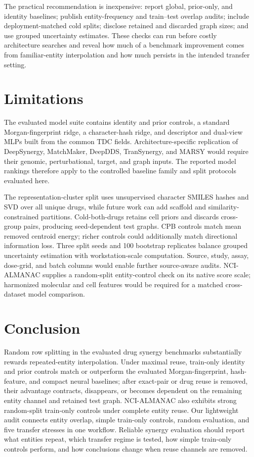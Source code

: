 \documentclass[conference]{IEEEtran}
\begin{document}
The practical recommendation is inexpensive: report global, prior-only, and identity baselines; publish entity-frequency and train--test overlap audits; include deployment-matched cold splits; disclose retained and discarded graph sizes; and use grouped uncertainty estimates. These checks can run before costly architecture searches and reveal how much of a benchmark improvement comes from familiar-entity interpolation and how much persists in the intended transfer setting.

\section{Limitations}

The evaluated model suite contains identity and prior controls, a standard Morgan-fingerprint ridge, a character-hash ridge, and descriptor and dual-view MLPs built from the common TDC fields. Architecture-specific replication of DeepSynergy, MatchMaker, DeepDDS, TranSynergy, and MARSY would require their genomic, perturbational, target, and graph inputs. The reported model rankings therefore apply to the controlled baseline family and split protocols evaluated here.

The representation-cluster split uses unsupervised character SMILES hashes and SVD over all unique drugs, while future work can add scaffold and similarity-constrained partitions. Cold-both-drugs retains cell priors and discards cross-group pairs, producing seed-dependent test graphs. CPB controls match mean removed centroid energy; richer controls could additionally match directional information loss. Three split seeds and 100 bootstrap replicates balance grouped uncertainty estimation with workstation-scale computation. Source, study, assay, dose-grid, and batch columns would enable further source-aware audits. NCI-ALMANAC supplies a random-split entity-control check on its native score scale; harmonized molecular and cell features would be required for a matched cross-dataset model comparison.

\section{Conclusion}

Random row splitting in the evaluated drug synergy benchmarks substantially rewards repeated-entity interpolation. Under maximal reuse, train-only identity and prior controls match or outperform the evaluated Morgan-fingerprint, hash-feature, and compact neural baselines; after exact-pair or drug reuse is removed, their advantage contracts, disappears, or becomes dependent on the remaining entity channel and retained test graph. NCI-ALMANAC also exhibits strong random-split train-only controls under complete entity reuse. Our lightweight audit connects entity overlap, simple train-only controls, random evaluation, and five transfer stresses in one workflow. Reliable synergy evaluation should report what entities repeat, which transfer regime is tested, how simple train-only controls perform, and how conclusions change when reuse channels are removed.
\end{document}
